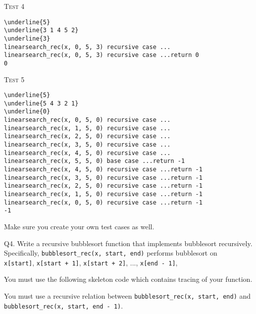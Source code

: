 \textsc{Test 4}
\begin{Verbatim}[commandchars=\\\{\}, fontsize=\small, frame=single]
\underline{5}
\underline{3 1 4 5 2}
\underline{3}
linearsearch_rec(x, 0, 5, 3) recursive case ...
linearsearch_rec(x, 0, 5, 3) recursive case ...return 0
0
\end{Verbatim}

\textsc{Test 5}
\begin{Verbatim}[commandchars=\\\{\}, fontsize=\small, frame=single]
\underline{5}
\underline{5 4 3 2 1}
\underline{0}
linearsearch_rec(x, 0, 5, 0) recursive case ...
linearsearch_rec(x, 1, 5, 0) recursive case ...
linearsearch_rec(x, 2, 5, 0) recursive case ...
linearsearch_rec(x, 3, 5, 0) recursive case ...
linearsearch_rec(x, 4, 5, 0) recursive case ...
linearsearch_rec(x, 5, 5, 0) base case ...return -1
linearsearch_rec(x, 4, 5, 0) recursive case ...return -1
linearsearch_rec(x, 3, 5, 0) recursive case ...return -1
linearsearch_rec(x, 2, 5, 0) recursive case ...return -1
linearsearch_rec(x, 1, 5, 0) recursive case ...return -1
linearsearch_rec(x, 0, 5, 0) recursive case ...return -1
-1
\end{Verbatim}

Make sure you create your own test cases as well.







\newpage
Q4.
Write a recursive bubblesort function that implements
bubblesort recursively.
Specifically, \verb!bubblesort_rec(x, start, end)!
performs bubblesort on
\\
\verb!x[start]!,
\verb!x[start + 1]!,
\verb!x[start + 2]!, ...,
\verb!x[end - 1]!,

You must use the following skeleton code which
contains tracing of your function.

You must use a recursive relation between
\verb!bubblesort_rec(x, start, end)!
and
\\
\verb!bubblesort_rec(x, start, end - 1)!.

